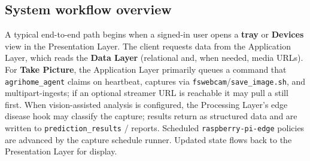 \subsection{System workflow overview}

A typical end-to-end path begins when a signed-in user opens a \textbf{tray} or \textbf{Devices} view in the Presentation Layer. The client requests data from the Application Layer, which reads the \textbf{Data Layer} (relational and, when needed, media URLs). For \textbf{Take Picture}, the Application Layer primarily queues a command that \texttt{agrihome\_agent} claims on heartbeat, captures via \texttt{fswebcam}/\texttt{save\_image.sh}, and multipart-ingests; if an optional streamer URL is reachable it may pull a still first. When vision-assisted analysis is configured, the Processing Layer's edge disease hook may classify the capture; results return as structured data and are written to \texttt{prediction\_results} / reports. Scheduled \texttt{raspberry-pi-edge} policies are advanced by the capture schedule runner. Updated state flows back to the Presentation Layer for display.

